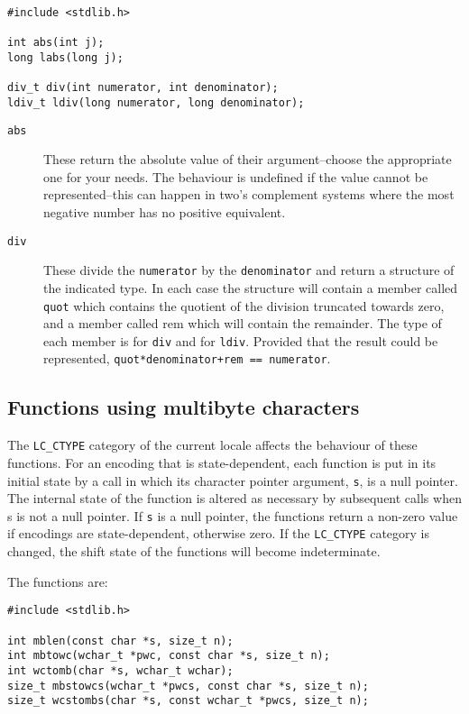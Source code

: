    \begin{Verbatim}
#include <stdlib.h>

int abs(int j);
long labs(long j);

div_t div(int numerator, int denominator);
ldiv_t ldiv(long numerator, long denominator);
\end{Verbatim}

   \begin{description}
    \item[\texttt{abs}] These return the  absolute  value  of  their  argument--choose the
     appropriate one for your needs.  The behaviour is undefined if the value
     cannot be  represented--this can  happen  in  two's  complement
     systems where the most negative number has no positive equivalent.

    \item[\texttt{div}] These divide the \texttt{numerator} by the \texttt{denominator}
     and  return a  structure  of  the  indicated  type.  In each case the
     structure  will  contain  a  member  called \texttt{quot}   which
     contains  the  quotient of the division truncated towards zero, and
     a member called  rem  which  will  contain  the remainder.   The  type  of
     each member is \kint{} for \texttt{div} and \klong{}
     for  \texttt{ldiv}.   Provided  that  the  result  could  be
     represented, \texttt{quot*denominator+rem == numerator}.
   \end{description}

  

  \subsection{Functions using multibyte characters}
   

   The \texttt{LC\_CTYPE} category of the current locale affects the
    behaviour of these functions. For an encoding that is state-dependent, each
    function is put in its initial state by a call in which its character
    pointer argument, \texttt{s}, is a null pointer. The internal state of
    the function is altered as necessary by subsequent calls when s is not
    a null pointer.  If \texttt{s} is a null pointer, the functions return
    a non-zero value if encodings are state-dependent, otherwise zero. If the
    \texttt{LC\_CTYPE} category is changed, the shift state of the functions
    will become indeterminate.


   The functions are:


   \begin{Verbatim}
#include <stdlib.h>

int mblen(const char *s, size_t n);
int mbtowc(wchar_t *pwc, const char *s, size_t n);
int wctomb(char *s, wchar_t wchar);
size_t mbstowcs(wchar_t *pwcs, const char *s, size_t n);
size_t wcstombs(char *s, const wchar_t *pwcs, size_t n);
\end{Verbatim}

